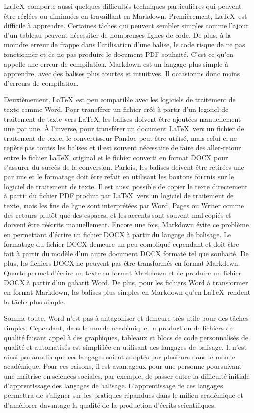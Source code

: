 \documentclass[
  letterpaper,
  DIV=11,
  numbers=noendperiod]{scrreprt}
\begin{document}
\LaTeX~comporte aussi quelques difficultés techniques particulières qui
peuvent être réglées ou diminuées en travaillant en Markdown.
Premièrement, \LaTeX~est difficile à apprendre. Certaines tâches qui
peuvent sembler simples comme l'ajout d'un tableau peuvent nécessiter de
nombreuses lignes de code. De plus, à la moindre erreur de frappe dans
l'utilisation d'une balise, le code risque de ne pas fonctionner et de
ne pas produire le document PDF souhaité. C'est ce qu'on appelle une
erreur de compilation. Markdown est un langage plus simple à apprendre,
avec des balises plus courtes et intuitives. Il occasionne donc moins
d'erreurs de compilation.

Deuxièmement, \LaTeX~est peu compatible avec les logiciels de traitement
de texte comme Word. Pour transférer un fichier créé à partir d'un
logiciel de traitement de texte vers \LaTeX, les balises doivent être
ajoutées manuellement une par une. À l'inverse, pour transférer un
document \LaTeX~vers un fichier de traitement de texte, le convertisseur
Pandoc peut être utilisé, mais celui-ci ne repère pas toutes les balises
et il est souvent nécessaire de faire des aller-retour entre le fichier
\LaTeX~original et le fichier converti en format DOCX pour s'assurer du
succès de la conversion. Parfois, les balises doivent être retirées une
par une et le formatage doit être refait en utilisant les boutons
fournis sur le logiciel de traitement de texte. Il est aussi possible de
copier le texte directement à partir du fichier PDF produit par
\LaTeX~vers un logiciel de traitement de texte, mais les fins de ligne
sont interprétées par Word, Pages ou Writer comme des retours plutôt que
des espaces, et les accents sont souvent mal copiés et doivent être
réécrits manuellement. Encore une fois, Markdown évite ce problème en
permettant d'écrire un fichier DOCX à partir du langage de balisage. Le
formatage du fichier DOCX demeure un peu compliqué cependant et doit
être fait à partir du modèle d'un autre document DOCX formaté tel que
souhaité. De plus, les fichiers DOCX ne peuvent pas être transformés en
format Markdown. Quarto permet d'écrire un texte en format Markdown et
de produire un fichier DOCX à partir d'un gabarit Word. De plus, pour
les fichiers Word à transformer en format Markdown, les balises plus
simples en Markdown qu'en \LaTeX~rendent la tâche plus simple.

Somme toute, Word n'est pas à antagoniser et demeure très utile pour des
tâches simples. Cependant, dans le monde académique, la production de
fichiers de qualité faisant appel à des graphiques, tableaux et blocs de
code personnalisés de qualité et automatisés est simplifiée en utilisant
des langages de balisage. Il n'est ainsi pas anodin que ces langages
soient adoptés par plusieurs dans le monde académique. Pour ces raisons,
il est avantageux pour une personne poursuivant une maîtrise en sciences
sociales, par exemple, de passer outre la difficulté initiale
d'apprentissage des langages de balisage. L'apprentissage de ces
langages permettra de s'aligner sur les pratiques répandues dans le
milieu académique et d'améliorer davantage la qualité de la production
d'écrits scientifiques.
\end{document}
